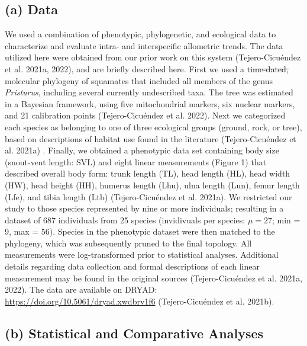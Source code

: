 \documentclass[
  11pt,
]{article}
\providecommand{\DIFaddtex}[1]{{\protect\color{blue}\uwave{#1}}} %
\providecommand{\DIFdeltex}[1]{{\protect\color{red}\sout{#1}}}                      %
\providecommand{\DIFaddbegin}{} %
\providecommand{\DIFaddend}{} %
\providecommand{\DIFdelbegin}{} %
\providecommand{\DIFdelend}{} %
\providecommand{\DIFadd}[1]{\texorpdfstring{\DIFaddtex{#1}}{#1}} %
\providecommand{\DIFdel}[1]{\texorpdfstring{\DIFdeltex{#1}}{}} %
\newcommand{\DIFscaledelfig}{0.5}
\newlength{\DIFdelgraphicswidth} %
\newlength{\DIFdelgraphicsheight} %
\newcommand{\DIFaddincludegraphics}[2][]{{\color{blue}\fbox{\DIFOincludegraphics[#1]{#2}}}} %
\newcommand{\DIFdelincludegraphics}[2][]{%
\sbox{\DIFdelgraphicsbox}{\DIFOincludegraphics[#1]{#2}}%
\settoboxwidth{\DIFdelgraphicswidth}{\DIFdelgraphicsbox} %
\settoboxtotalheight{\DIFdelgraphicsheight}{\DIFdelgraphicsbox} %
\scalebox{\DIFscaledelfig}{%
\parbox[b]{\DIFdelgraphicswidth}{\usebox{\DIFdelgraphicsbox}\\[-\baselineskip] \rule{\DIFdelgraphicswidth}{0em}}\llap{\resizebox{\DIFdelgraphicswidth}{\DIFdelgraphicsheight}{%
\setlength{\unitlength}{\DIFdelgraphicswidth}%
\begin{picture}(1,1)%
\thicklines\linethickness{2pt} %
{\color[rgb]{1,0,0}\put(0,0){\framebox(1,1){}}}%
{\color[rgb]{1,0,0}\put(0,0){\line( 1,1){1}}}%
{\color[rgb]{1,0,0}\put(0,1){\line(1,-1){1}}}%
\end{picture}%
}\hspace*{3pt}}} %
} %
\DeclareRobustCommand{\DIFaddbegin}{\DIFOaddbegin \let\includegraphics\DIFaddincludegraphics} %
\DeclareRobustCommand{\DIFaddend}{\DIFOaddend \let\includegraphics\DIFOincludegraphics} %
\DeclareRobustCommand{\DIFdelbegin}{\DIFOdelbegin \let\includegraphics\DIFdelincludegraphics} %
\DeclareRobustCommand{\DIFdelend}{\DIFOaddend \let\includegraphics\DIFOincludegraphics} %
\begin{document}
\hypertarget{a-data}{%
\subsection{(a) Data}\label{a-data}}

We used a combination of phenotypic, phylogenetic, and ecological data
to characterize and evaluate intra- and interspecific allometric trends.
The data utilized here were obtained from our prior work on this system
(Tejero-Cicuéndez et al. 2021a, 2022), and are briefly described here.
First we used a \DIFdelbegin \DIFdel{time-dated, }\DIFdelend \DIFaddbegin \DIFadd{time-calibrated }\DIFaddend molecular phylogeny of squamates that
included all members of the genus \emph{Pristurus}, including several
currently undescribed taxa. The tree was estimated in a Bayesian
framework, using five mitochondrial markers, six nuclear markers, and 21
calibration points (Tejero-Cicuéndez et al. 2022). Next we categorized
each species as belonging to one of three ecological groups (ground,
rock, or tree), based on descriptions of habitat use found in the
literature (Tejero-Cicuéndez et al. 2021a) \DIFaddbegin \textbf{\DIFadd{MORE HERE}}\DIFaddend . Finally,
we obtained a phenotypic data set containing body size (snout-vent
length: SVL) and eight linear measurements (Figure 1) that described
overall body form: trunk length (TL), head length (HL), head width (HW),
head height (HH), humerus length (Lhu), ulna length (Lun), femur length
(Lfe), and tibia length (Ltb) (Tejero-Cicuéndez et al. 2021a). We
restricted our study to those species represented by nine or more \DIFaddbegin \DIFadd{adult
}\DIFaddend individuals; resulting in a dataset of 687 individuals from 25 species
(invidivuals per species: \(\mu=27\); min = 9, max = 56). Species in the
phenotypic dataset were then matched to the phylogeny, which was
subsequently pruned to the final topology. All measurements were
log-transformed prior to statistical analyses. Additional details
regarding data collection and formal descriptions of each linear
measurement may be found in the original sources (Tejero-Cicuéndez et
al. 2021a, 2022). The data are available on DRYAD:
\url{https://doi.org/10.5061/dryad.xwdbrv1f6} (Tejero-Cicuéndez et al.
2021b).

\hypertarget{b-statistical-and-comparative-analyses}{%
\subsection{(b) Statistical and Comparative
Analyses}\label{b-statistical-and-comparative-analyses}}
\end{document}
